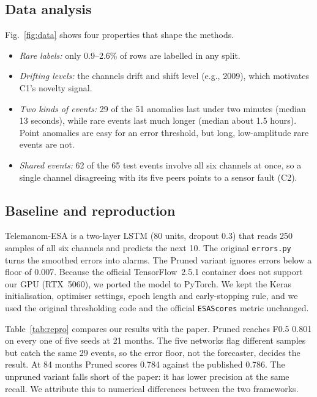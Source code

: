 \documentclass[conference]{IEEEtran}
\begin{document}
\subsection{Data analysis}
Fig.~\ref{fig:data} shows four properties that shape the methods.
\begin{itemize}
\item \emph{Rare labels:} only 0.9--2.6\% of rows are labelled in any split.
\item \emph{Drifting levels:} the channels drift and shift level (e.g., 2009), which motivates C1's novelty signal.
\item \emph{Two kinds of events:} 29 of the 51 anomalies last under two minutes (median 13 seconds), while rare events last much longer (median about 1.5 hours). Point anomalies are easy for an error threshold, but long, low-amplitude rare events are not.
\item \emph{Shared events:} 62 of the 65 test events involve all six channels at once, so a single channel disagreeing with its five peers points to a sensor fault (C2).
\end{itemize}

\subsection{Baseline and reproduction}\label{sec:repro}
Telemanom-ESA is a two-layer LSTM (80 units, dropout 0.3) that reads 250 samples of all six channels and predicts the next 10. The original \texttt{errors.py} turns the smoothed errors into alarms. The Pruned variant ignores errors below a floor of 0.007. Because the official TensorFlow~2.5.1 container does not support our GPU (RTX~5060), we ported the model to PyTorch. We kept the Keras initialisation, optimiser settings, epoch length and early-stopping rule, and we used the original thresholding code and the official \texttt{ESAScores} metric unchanged.

Table~\ref{tab:repro} compares our results with the paper. Pruned reaches F0.5 0.801 on every one of five seeds at 21 months. The five networks flag different samples but catch the same 29 events, so the error floor, not the forecaster, decides the result. At 84 months Pruned scores 0.784 against the published 0.786. The unpruned variant falls short of the paper: it has lower precision at the same recall. We attribute this to numerical differences between the two frameworks.
\end{document}
